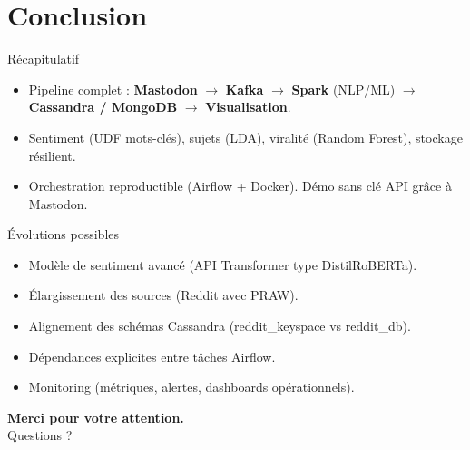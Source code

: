 \documentclass[11pt,aspectratio=169]{beamer}
\begin{document}
\section{Conclusion}

\begin{frame}{Récapitulatif}
  \begin{itemize}[leftmargin=*]
    \item Pipeline complet : \textbf{Mastodon} $\rightarrow$ \textbf{Kafka} $\rightarrow$ \textbf{Spark} (NLP/ML) $\rightarrow$ \textbf{Cassandra / MongoDB} $\rightarrow$ \textbf{Visualisation}.
    \item Sentiment (UDF mots-clés), sujets (LDA), viralité (Random Forest), stockage résilient.
    \item Orchestration reproductible (Airflow + Docker). Démo sans clé API grâce à Mastodon.
  \end{itemize}
\end{frame}

\begin{frame}{Évolutions possibles}
  \begin{itemize}[leftmargin=*]
    \item Modèle de sentiment avancé (API Transformer type DistilRoBERTa).
    \item Élargissement des sources (Reddit avec PRAW).
    \item Alignement des schémas Cassandra (reddit\_keyspace vs reddit\_db).
    \item Dépendances explicites entre tâches Airflow.
    \item Monitoring (métriques, alertes, dashboards opérationnels).
  \end{itemize}
\end{frame}

\begin{frame}{}
  \begin{center}
    \textbf{Merci pour votre attention.}\\[1em]
    Questions ?
  \end{center}
\end{frame}
\end{document}
